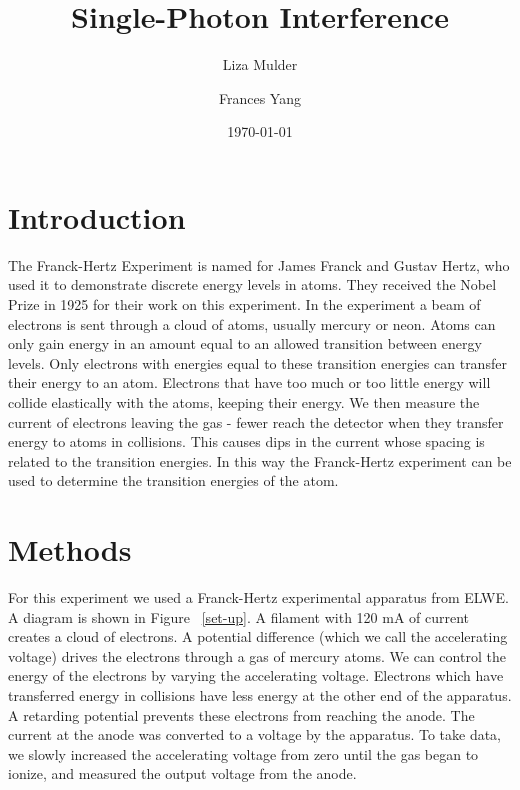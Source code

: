 \documentclass[prb,preprint]{revtex4-1}
\begin{document}

\title{Single-Photon Interference}


\author{Liza Mulder}


\author{Frances Yang}


\date{\today}



\begin{abstract}

\end{abstract}

\maketitle

\section{Introduction} 

The Franck-Hertz Experiment is named for James Franck and Gustav Hertz, who used it to demonstrate discrete energy levels in atoms. 
They received the Nobel Prize in 1925 for their work on this experiment. 
In the experiment a beam of electrons is sent through a cloud of atoms, usually mercury or neon. 
Atoms can only gain energy in an amount equal to an allowed transition between energy levels. 
Only electrons with energies equal to these transition energies can transfer their energy to an atom. 
Electrons that have too much or too little energy will collide elastically with the atoms, keeping their energy. 
We then measure the current of electrons leaving the gas - fewer reach the detector when they transfer energy to atoms in collisions. 
This causes dips in the current whose spacing is related to the transition energies. 
In this way the Franck-Hertz experiment can be used to determine the transition energies of the atom. 

\section{Methods}

For this experiment we used a Franck-Hertz experimental apparatus from ELWE. A diagram is shown in Figure ~\ref{set-up}. 
A filament with 120 mA of current creates a cloud of electrons. 
A potential difference (which we call the accelerating voltage) drives the electrons through a gas of mercury atoms. 
We can control the energy of the electrons by varying the accelerating voltage. 
Electrons which have transferred energy in collisions have less energy at the other end of the apparatus. 
A retarding potential prevents these electrons from reaching the anode. 
The current at the anode was converted to a voltage by the apparatus. 
To take data, we slowly increased the accelerating voltage from zero until the gas began to ionize, and measured the output voltage from the anode. 
\end{document}
